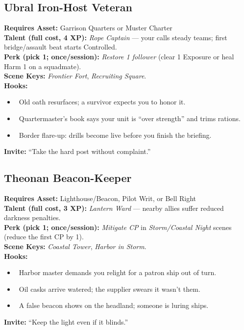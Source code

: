\documentclass[11pt]{article}
\begin{document}
\subsection*{Ubral Iron-Host Veteran}
\textbf{Requires Asset:} Garrison Quarters or Muster Charter\\
\textbf{Talent (full cost, 4 XP):} \emph{Rope Captain} — your calls steady teams; first bridge/assault beat starts Controlled.\\
\textbf{Perk (pick 1; once/session):} \emph{Restore 1 follower} (clear 1 Exposure or heal Harm 1 on a squadmate).\\
\textbf{Scene Keys:} \emph{Frontier Fort}, \emph{Recruiting Square}.\\[2pt]
\textbf{Hooks:}
\begin{itemize}
  \item \heartsuit~Old oath resurfaces; a survivor expects you to honor it.
  \item \clubsuit~Quartermaster’s book says your unit is “over strength” and trims rations.
  \item \spadesuit~Border flare-up: drills become live before you finish the briefing.
\end{itemize}
\textbf{Invite:} “Take the hard post without complaint.”

\subsection*{Theonan Beacon-Keeper}
\textbf{Requires Asset:} Lighthouse/Beacon, Pilot Writ, or Bell Right\\
\textbf{Talent (full cost, 3 XP):} \emph{Lantern Ward} — nearby allies suffer reduced darkness penalties.\\
\textbf{Perk (pick 1; once/session):} \emph{Mitigate CP} in \emph{Storm/Coastal Night} scenes (reduce the first CP by 1).\\
\textbf{Scene Keys:} \emph{Coastal Tower}, \emph{Harbor in Storm}.\\[2pt]
\textbf{Hooks:}
\begin{itemize}
  \item \clubsuit~Harbor master demands you relight for a patron ship out of turn.
  \item \diamondsuit~Oil casks arrive watered; the supplier swears it wasn’t them.
  \item \spadesuit~A false beacon shows on the headland; someone is luring ships.
\end{itemize}
\textbf{Invite:} “Keep the light even if it blinds.”
\end{document}
